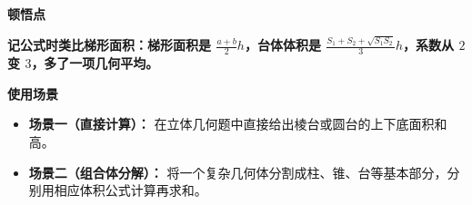 \begin{explanationbox}
	\medskip

	\textbf{\textcolor{CExplanation}{顿悟点}}

	\textbf{记公式时类比梯形面积：梯形面积是 $\frac{a+b}{2}h$，台体体积是 $\frac{S_1+S_2+\sqrt{S_1S_2}}{3}h$，系数从 $2$ 变 $3$，多了一项几何平均。}

	\medskip

	\textbf{\textcolor{CExplanation}{使用场景}}

	\begin{itemize}[leftmargin=*, itemsep=0.5em, topsep=0.4em]
		\item \textbf{场景一（直接计算）：} 在立体几何题中直接给出棱台或圆台的上下底面积和高。
		\item \textbf{场景二（组合体分解）：} 将一个复杂几何体分割成柱、锥、台等基本部分，分别用相应体积公式计算再求和。
	\end{itemize}

\end{explanationbox}